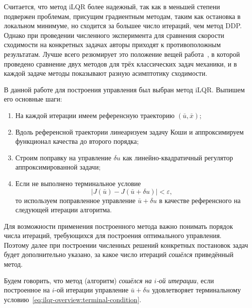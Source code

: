 \documentclass[../../doc.tex]{subfiles}
\begin{document}
    Считается, что метод iLQR более надежный,
    так как в меньшей степени подвержен проблемам,
    присущим градиентным методам,
    таким как остановка в локальном минимуме,
    но сходится за большее число итераций, чем метод DDP.
    Однако при проведении численного эксперимента для сравнения скорости сходимости на конкретных задачах авторы приходят к противоположным результатам.
    Лучше всего резюмирует это положение вещей работа~\cite{manchester2016}, в которой проведено сравнение двух методов для трёх классических задач механики, и в каждой задаче методы показывают разную асимптотику сходимости.

    В данной работе для построения управления был выбран метод iLQR. Выпишем его основные шаги:
    \begin{enumerate}\itemsep0em
        \item На каждой итерации имеем референсную траекторию $(\bar u, \bar x)$;
        \item Вдоль референсной траектории линеаризуем задачу Коши и аппроксимируем функционал качества до второго порядка;
        \item Строим поправку на управление $\delta u$ как линейно-квадратичный регулятор аппроксимированной задачи;
        \item Если не выполнено терминальное условие
            \begin{equation}\label{eq:ilqr-overview:terminal-condition}
                \left|J(\bar u) - J(\bar u + \delta u)\right| < \varepsilon,
            \end{equation}
            то используем поправленное управление $\bar u + \delta u$ в качестве референсного на следующей итерации алгоритма.
    \end{enumerate}

    Для возможности применения построенного метода важно понимать порядок числа итераций,
    требующихся для построения оптимального управления.
    Поэтому далее при построении численных решений конкретных постановок задач
    будет дополнительно указано, за какое число итераций \textit{сошёлся} приведённый метод.
    \begin{definition}
        Будем говорить, что метод (алгоритм) \textit{сошёлся на $i$-ой итерации},
        если построенное на $i$-ой итерации управление $\bar u + \delta u$
        удовлетворяет терминальному условию~\eqref{eq:ilqr-overview:terminal-condition}.
    \end{definition}

    \ifSubfilesClassLoaded{
        \nocite{*}
        \clearpage
        
        
    }{}
\end{document}
